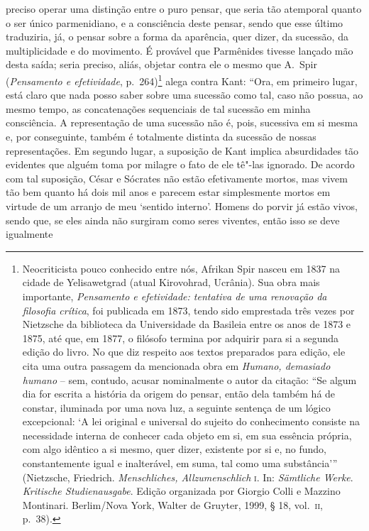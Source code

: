 preciso operar uma distinção entre o puro pensar, que seria tão
atemporal quanto o ser único parmenidiano, e a consciência deste
pensar, sendo que esse último traduziria, já, o pensar sobre a forma da
aparência, quer dizer, da sucessão, da multiplicidade e do movimento. É
provável que Parmênides tivesse lançado mão desta saída; seria preciso,
aliás, objetar contra ele o mesmo que A.~Spir (\textit{Pensamento e
efetividade}, p.~264)\footnote{ Neocriticista pouco conhecido entre
nós, Afrikan Spir nasceu em 1837 na cidade de Yelisawetgrad (atual 
Kirovohrad, Ucrânia). Sua obra mais importante, \textit{Pensamento e efetividade:
tentativa de uma renovação da filosofia crítica}, foi publicada em
1873, tendo sido emprestada três vezes por Nietzsche da biblioteca da
Universidade da Basileia entre os anos de 1873 e 1875, até que, em
1877, o filósofo termina por adquirir para si a segunda edição do
livro. No que diz respeito aos textos preparados para edição, ele cita
uma outra passagem da mencionada obra em \textit{Humano, demasiado
humano} -- sem, contudo, acusar nominalmente o autor da citação: ``Se
algum dia for escrita a história da origem do pensar, então dela também
há de constar, iluminada por uma nova luz, a seguinte sentença de um
lógico excepcional: `A lei original e universal do sujeito do
conhecimento consiste na necessidade interna de conhecer cada objeto em
si, em sua essência própria, com algo idêntico a si mesmo, quer dizer,
existente por si e, no fundo, constantemente igual e inalterável, em
suma, tal como uma substância''' (Nietzsche, Friedrich.
\textit{Menschliches, Allzumenschlich} \textsc{i.} In:
\textit{Sämtliche Werke}. \textit{Kritische Studienausgabe}. Edição
organizada por Giorgio Colli e Mazzino Montinari. Berlim/Nova York,
Walter de Gruyter, 1999, § 18, vol.~\textsc{ii}, p.~38).} alega
contra Kant: ``Ora, em primeiro lugar, está claro que nada posso saber
sobre uma sucessão como tal, caso não possua, ao mesmo tempo, as
concatenações sequenciais de tal sucessão em minha consciência. A
representação de uma sucessão não é, pois, sucessiva em si mesma e, por
conseguinte, também é totalmente distinta da sucessão de nossas
representações. Em segundo lugar, a suposição de Kant implica
absurdidades tão evidentes que alguém toma por milagre o fato de ele 
tê"-las ignorado. De acordo com tal suposição, César e Sócrates
não estão efetivamente mortos, mas vivem tão bem quanto há dois mil anos
e parecem estar simplesmente mortos em virtude de um arranjo de meu
`sentido interno'. Homens do porvir já estão vivos, sendo que, se eles
ainda não surgiram como seres viventes, então isso se deve igualmente
